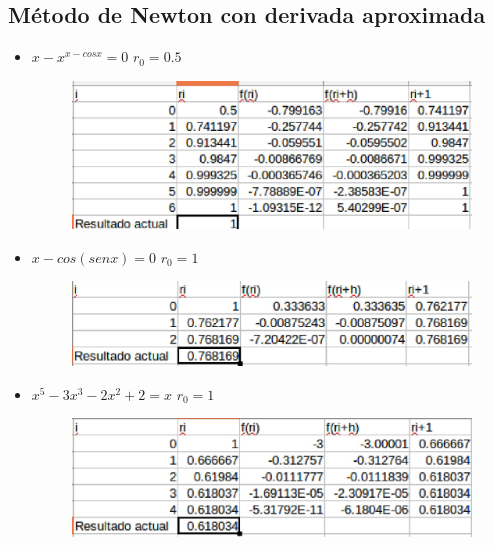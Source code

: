 \documentclass[a4paper,12pt]{article}
\begin{document}
    
    \newpage
  
    \subsection{Método de Newton con derivada aproximada}
    
    \begin{itemize}
    \item $x-x^{x-cosx} = 0$ $r_{0} = 0.5$
     
     \begin{figure}[h]
      \centering
      \includegraphics[scale = 0.6]{61.eps}
     \end{figure}
   
    
    \item $x-cos(senx) = 0$ $r_{0} = 1$
      
      \begin{figure}[h]
      \centering
      \includegraphics[scale = 0.6]{62.eps}
     \end{figure}
    
    \item $x^5 - 3x^3 - 2x^2 + 2 = x$ $r_{0} = 1$
     
      \begin{figure}[h]
      \centering
      \includegraphics[scale = 0.6]{63.eps}
     \end{figure}
    
    \end{itemize}
  
\end{document}
